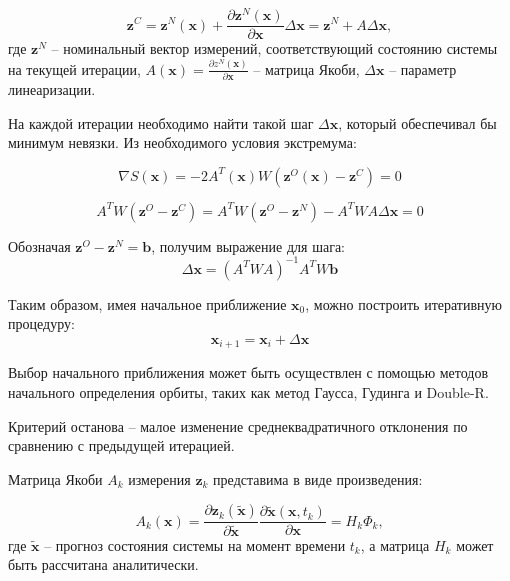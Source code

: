 \begin{equation*}
    \mathbf{z}^C = \mathbf{z}^N (\mathbf{x}) +  
    \frac{\partial \mathbf{z}^N (\mathbf{x})}{\partial \mathbf{x}} \Delta \mathbf{x} = 
    \mathbf{z}^N + A \Delta \mathbf{x},
\end{equation*}
где $\mathbf{z}^N$ -- номинальный вектор измерений, соответствующий состоянию системы на текущей итерации,
 $A (\mathbf{x}) = \frac{\partial z^N (\mathbf{x})}{\partial \mathbf{x}}$ -- матрица Якоби,
 $\Delta \mathbf{x}$ -- параметр линеаризации.

На каждой итерации необходимо найти такой шаг $\Delta \mathbf{x}$, который обеспечивал бы
минимум невязки. Из необходимого условия экстремума:

\begin{equation*}
    \nabla S(\mathbf{x}) = - 2 A^T (\mathbf{x}) W (\mathbf{z}^O (\mathbf{x}) - \mathbf{z}^C) = 0
\end{equation*}

\begin{equation*}
    A^T W (\mathbf{z}^O - \mathbf{z}^C) 
    = A^T W (\mathbf{z}^O - \mathbf{z}^N) - A^T W A \Delta \mathbf{x} = 0
\end{equation*}

Обозначая $\mathbf{z}^O - \mathbf{z}^N = \mathbf{b}$, получим выражение для шага:
\begin{equation}
    \Delta \mathbf{x} = (A^T W A)^{-1} A^T W \mathbf{b}
\end{equation}

Таким образом, имея начальное приближение $\mathbf{x}_{0}$, можно построить итеративную процедуру:
\begin{equation}
    \mathbf{x}_{i + 1} = \mathbf{x}_{i} + \Delta \mathbf{x}
\end{equation}

Выбор начального приближения может быть осуществлен с помощью методов начального
определения орбиты, таких как метод Гаусса, Гудинга и Double-R.

Критерий останова -- малое изменение среднеквадратичного отклонения по сравнению с предыдущей итерацией.

Матрица Якоби $A_k$ измерения $\mathbf{z}_k$ представима в виде произведения:

\begin{equation*}
    A_k(\mathbf{x}) = \frac{\partial \mathbf{z}_k (\mathbf{\tilde{x}})}{\partial \mathbf{\tilde{x}}}
    \frac{\partial \mathbf{\tilde{x}} (\mathbf{x}, t_k)}{\partial \mathbf{x}} = H_k \Phi_k,
\end{equation*}
где $\mathbf{\tilde{x}}$ -- прогноз состояния системы на момент времени $t_k$, 
а матрица $H_k$ может быть рассчитана аналитически.

